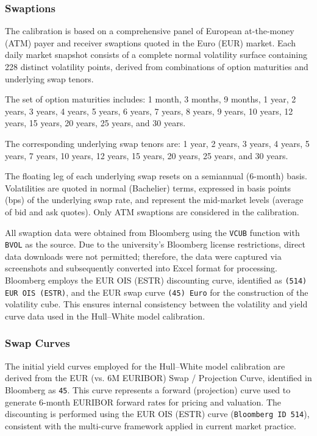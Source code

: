 \subsubsection{Swaptions}
The calibration is based on a comprehensive panel of European at-the-money (ATM) payer and receiver swaptions quoted in the Euro (EUR) market. Each daily market snapshot consists of a complete normal volatility surface containing 228 distinct volatility points, derived from combinations of option maturities and underlying swap tenors.

The set of option maturities includes:
1 month, 3 months, 9 months, 1 year, 2 years, 3 years, 4 years, 5 years, 6 years, 7 years, 8 years, 9 years, 10 years, 12 years, 15 years, 20 years, 25 years, and 30 years.

The corresponding underlying swap tenors are:
1 year, 2 years, 3 years, 4 years, 5 years, 7 years, 10 years, 12 years, 15 years, 20 years, 25 years, and 30 years.

The floating leg of each underlying swap resets on a semiannual (6-month) basis. Volatilities are quoted in normal (Bachelier) terms, expressed in basis points (bps) of the underlying swap rate, and represent the mid-market levels (average of bid and ask quotes). Only ATM swaptions are considered in the calibration.

All swaption data were obtained from Bloomberg using the \texttt{VCUB} function with \texttt{BVOL} as the source. Due to the university's Bloomberg license restrictions, direct data downloads were not permitted; therefore, the data were captured via screenshots and subsequently converted into Excel format for processing. Bloomberg employs the EUR OIS (ESTR) discounting curve, identified as \texttt{(514) EUR OIS (ESTR)}, and the EUR swap curve \texttt{(45) Euro} for the construction of the volatility cube. This ensures internal consistency between the volatility and yield curve data used in the Hull–White model calibration.

\subsubsection{Swap Curves}
The initial yield curves employed for the Hull–White model calibration are derived from the EUR (vs. 6M EURIBOR) Swap / Projection Curve, identified in Bloomberg as \texttt{45}. This curve represents a forward (projection) curve used to generate 6-month EURIBOR forward rates for pricing and valuation. The discounting is performed using the EUR OIS (ESTR) curve (\texttt{Bloomberg ID 514}), consistent with the multi-curve framework applied in current market practice.


